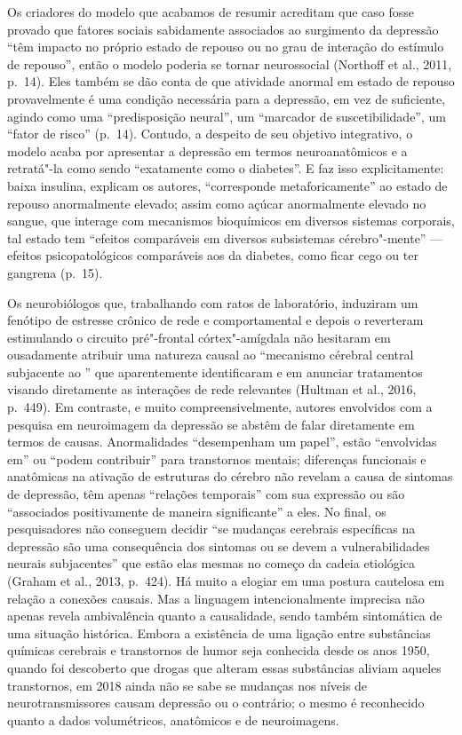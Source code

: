 Os criadores do modelo que acabamos de resumir acreditam que caso fosse
provado que fatores sociais sabidamente associados ao surgimento da
depressão ``têm impacto no próprio estado de repouso ou no grau de
interação do estímulo de repouso'', então o modelo poderia se tornar
neurossocial (Northoff et al., 2011, p.~14). Eles também se dão conta de
que atividade anormal em estado de repouso provavelmente é uma condição
necessária para a depressão, em vez de suficiente, agindo como uma
``predisposição neural'', um ``marcador de suscetibilidade'', um ``fator
de risco'' (p.~14). Contudo, a despeito de seu objetivo integrativo, o
modelo acaba por apresentar a depressão em termos neuroanatômicos e a
retratá"-la como sendo ``exatamente como o diabetes''. E faz isso
explicitamente: baixa insulina, explicam os autores, ``corresponde
metaforicamente'' ao estado de repouso anormalmente elevado; assim como
açúcar anormalmente elevado no sangue, que interage com mecanismos
bioquímicos em diversos sistemas corporais, tal estado tem ``efeitos
comparáveis em diversos subsistemas cérebro"-mente'' --- efeitos
psicopatológicos comparáveis aos da diabetes, como ficar cego ou ter
gangrena (p.~15).

Os neurobiólogos que, trabalhando com ratos de laboratório, induziram um
fenótipo de estresse crônico de rede e comportamental e depois o
reverteram estimulando o circuito pré"-frontal córtex"-amígdala não
hesitaram em ousadamente atribuir uma natureza causal ao ``mecanismo
cérebral central subjacente ao '' que aparentemente identificaram e
em anunciar tratamentos visando diretamente as interações de rede
relevantes (Hultman et al., 2016, p.~449). Em contraste, e muito
compreensivelmente, autores envolvidos com a pesquisa em neuroimagem da
depressão se abstêm de falar diretamente em termos de causas.
Anormalidades ``desempenham um papel'', estão ``envolvidas em'' ou
``podem contribuir'' para transtornos mentais; diferenças funcionais e
anatômicas na ativação de estruturas do cérebro não revelam a causa de
sintomas de depressão, têm apenas ``relações temporais'' com sua
expressão ou são ``associados positivamente de maneira significante'' a
eles. No final, os pesquisadores não conseguem decidir ``se mudanças
cerebrais específicas na depressão são uma consequência dos sintomas ou
se devem a vulnerabilidades neurais subjacentes'' que estão elas mesmas
no começo da cadeia etiológica (Graham et al., 2013, p.~424). Há muito a
elogiar em uma postura cautelosa em relação a conexões causais. Mas a
linguagem intencionalmente imprecisa não apenas revela ambivalência
quanto a causalidade, sendo também sintomática de uma situação
histórica. Embora a existência de uma ligação entre substâncias químicas
cerebrais e transtornos de humor seja conhecida desde os anos 1950,
quando foi descoberto que drogas que alteram essas substâncias aliviam
aqueles transtornos, em 2018 ainda não se sabe se mudanças nos níveis de
neurotransmissores causam depressão ou o contrário; o mesmo é
reconhecido quanto a dados volumétricos, anatômicos e de neuroimagens.

